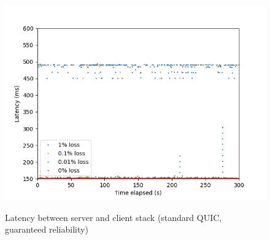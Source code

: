 \documentclass{mpaper}
\begin{document}
\begin{figure}
{   \includegraphics[scale=0.5]{images/graphics-reliable/150ms-stack-latencies-combined-reliable.png}
   \label{stack-rel-150}
 }
 \caption{Latency between server and client stack (standard QUIC, guaranteed reliability)}
 \label{stack-rel}
\end{figure}

\clearpage
\end{document}
